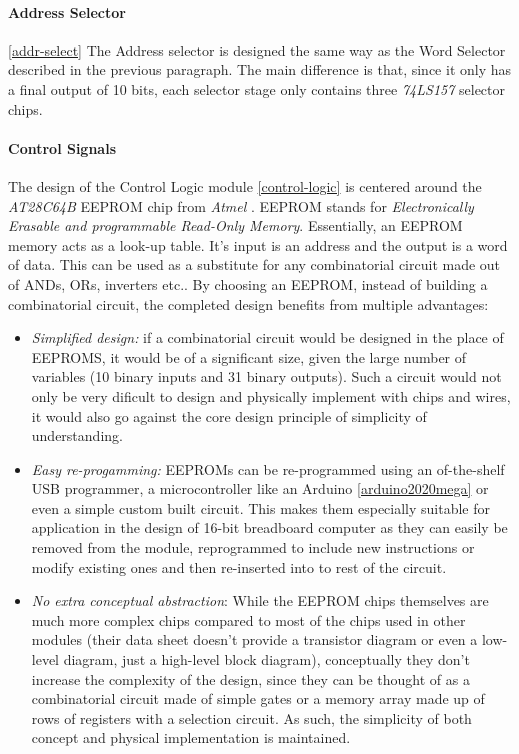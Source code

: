 

\paragraph{Address Selector} \ref{addr-select}
The Address selector is designed the same way as the Word Selector described in the previous
paragraph. The main difference is that, since it only has a final output of 10 bits,
each selector stage only contains three \emph{74LS157} \cite{74ls157} selector chips.



\paragraph{Control Signals}
The design of the Control Logic module \ref{control-logic} is centered around the \emph{AT28C64B}
EEPROM chip from \emph{Atmel} \cite{at28c64b}. EEPROM stands for \emph{Electronically Erasable
and programmable Read-Only Memory}. Essentially, an EEPROM memory acts as a look-up table.
It's input is an address and the output is a word of data. This can be used as a substitute
for any combinatorial circuit made out of ANDs, ORs, inverters etc.. By choosing an EEPROM,
instead of building a combinatorial circuit, the completed design benefits from multiple
advantages:
\begin{itemize}
  \item \emph{Simplified design:} if a combinatorial circuit would be designed in the place of
  EEPROMS, it would be of a significant size, given the large number of variables (10 binary
  inputs and 31 binary outputs). Such a circuit would not only be very dificult to design and
  physically implement with chips and wires, it would also go against the core design principle
  of simplicity of understanding.
  \item \emph{Easy re-progamming:} EEPROMs can be re-programmed using an of-the-shelf USB
  programmer, a microcontroller like an Arduino \ref{arduino2020mega} or even a simple custom
  built circuit. This makes them especially suitable for application in the design of 16-bit
  breadboard computer as they can easily be removed from the module, reprogrammed to include
  new instructions or modify existing ones and then re-inserted into to rest of the circuit.
  \item \emph{No extra conceptual abstraction}: While the EEPROM chips themselves are much more
  complex chips compared to most of the chips used in other modules (their data sheet doesn't
  provide a transistor diagram or even a low-level diagram, just a high-level block diagram),
  conceptually they don't increase the complexity of the design, since they can be thought of
  as a combinatorial circuit made of simple gates or a memory array made up of rows of registers
  with a selection circuit. As such, the simplicity of both concept and physical implementation
  is maintained.
\end{itemize}
